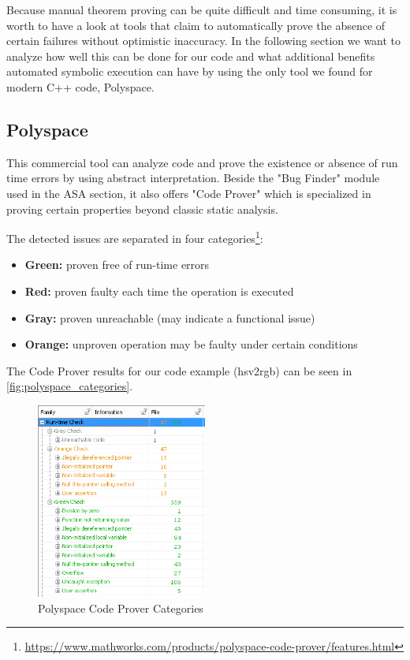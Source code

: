 \documentclass{scrreprt}
\begin{document}
Because manual theorem proving can be quite difficult and time consuming, it is worth to have a look at tools that claim to automatically prove the absence of certain failures without optimistic inaccuracy. In the following section we want to analyze how well this can be done for our code and what additional benefits automated symbolic execution can have by using the only tool we found for modern C++ code, Polyspace.

\subsection{Polyspace}

This commercial tool can analyze code and prove the existence or absence of run time errors by using abstract interpretation. Beside the "Bug Finder" module used in the ASA section, it also offers "Code Prover" which is specialized in proving certain properties beyond classic static analysis.

The detected issues are separated in four categories\footnote{\url{https://www.mathworks.com/products/polyspace-code-prover/features.html}}:
 \begin{itemize}
 	\item \textbf{Green:} proven free of run-time errors
 	\item \textbf{Red:} proven faulty each time the operation is executed
 	\item \textbf{Gray:} proven unreachable (may indicate a functional issue)
 	\item \textbf{Orange:} unproven operation may be faulty under certain conditions
 \end{itemize}

The Code Prover results for our code example (hsv2rgb) can be seen in \vref{fig:polyspace_categories}.

\begin{figure}[h]
	\centering
	\includegraphics[width=0.5\textwidth]{img/polyspace_categories}
	\caption[Polyspace Code Prover Categories]{Polyspace Code Prover Categories}
	\label{fig:polyspace_categories}
\end{figure}
\end{document}
